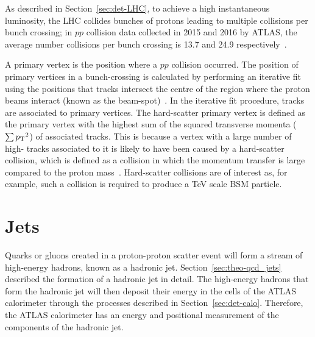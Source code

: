 As described in Section~\ref{sec:det-LHC}, to achieve a high instantaneous luminosity, the LHC collides bunches of protons leading to multiple collisions per bunch crossing;
in $pp$ collision data collected in 2015 and 2016 by ATLAS, the average number collisions per bunch crossing is 13.7 and 24.9 respectively~\cite{det-ATLAS_lumi_twiki}.

A primary vertex is the position where a $pp$ collision occurred.
The position of primary vertices in a bunch-crossing is calculated by performing
an iterative fit using the positions that tracks intersect the centre of the region where the proton beams interact (known as the beam-spot)~\cite{obj-tracks_pv}.
In the iterative fit procedure, tracks are associated to primary vertices.
The hard-scatter primary vertex is defined as the primary vertex with the highest sum of the squared transverse momenta ($\sum {\ensuremath{p_{\mathrm{T}}}}^2$) of associated tracks.
This is because a vertex with a large number of high-\pT{} tracks associated to it is likely to have been caused by a
hard-scatter collision, which is defined as a collision in which the momentum transfer is large compared to the proton mass~\cite{trig-hard_scatter}.
Hard-scatter collisions are of interest as, for example, such a collision is required to produce a TeV scale BSM particle.

\vspace{-0.5em}
\section{Jets}
\label{sec:obj-jets}

Quarks or gluons created in a proton-proton scatter event
will form a stream of high-energy hadrons, known as a hadronic jet.
Section~\ref{sec:theo-qcd_jets} described the formation of a hadronic jet in detail.
The high-energy hadrons that form the hadronic jet will then deposit their energy in the cells of the ATLAS calorimeter
through the processes described in Section~\ref{sec:det-calo}.
Therefore, the ATLAS calorimeter has an energy and positional measurement of the components of the hadronic jet.



